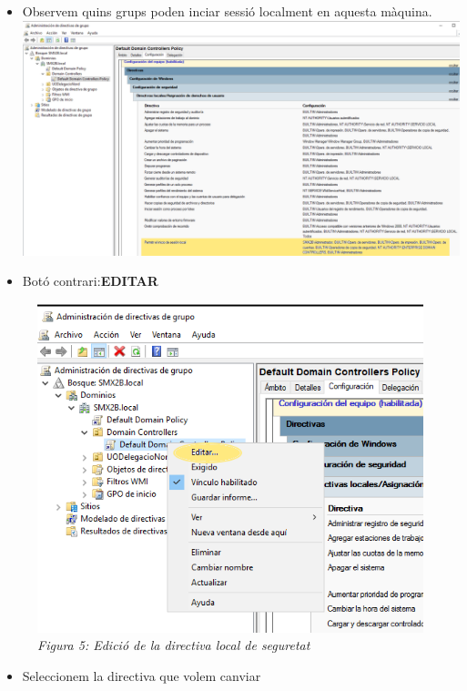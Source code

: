 \documentclass[
  a4paper,
]{article}
\providecommand{\tightlist}{%
  \setlength{\itemsep}{0pt}\setlength{\parskip}{0pt}}
\begin{document}
\begin{itemize}
\item
  Observem quins grups poden inciar sessió localment en aquesta màquina.
  \includegraphics{png/mostrarDirectiva1.png}
\item
  Botó contrari:\textbf{EDITAR}
\end{itemize}

\begin{figure}
\centering
\includegraphics{png/EditarDirectiva1.png}
\caption{\emph{Figura 5: Edició de la directiva local de seguretat}}
\end{figure}

\begin{itemize}
\tightlist
\item
  Seleccionem la directiva que volem canviar
\end{itemize}
\end{document}
